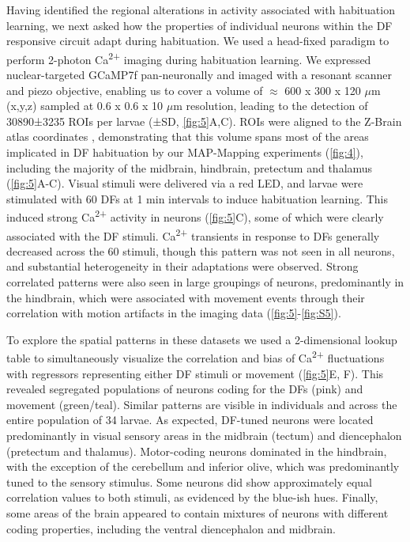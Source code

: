 \documentclass[9pt,lineno]{RandlettLab_elife}
\begin{document}
Having identified the regional alterations in activity associated with habituation learning, we next asked how the properties of individual neurons within the DF responsive circuit adapt during habituation. We used a head-fixed paradigm to perform 2-photon Ca\textsuperscript{2+} imaging during habituation learning. We expressed nuclear-targeted GCaMP7f pan-neuronally and imaged with a resonant scanner and piezo objective, enabling us to cover a volume of $\approx$ 600 x 300 x 120 $\mu$m (x,y,z) sampled at 0.6 x 0.6 x 10 $\mu$m resolution, leading to the detection of 30890±3235 ROIs per larvae (±SD, \autoref{fig:5}A,C). ROIs were aligned to the Z-Brain atlas coordinates \cite{Randlett2015-hy}, demonstrating that this volume spans most of the areas implicated in DF habituation by our MAP-Mapping experiments (\autoref{fig:4}), including the majority of the midbrain, hindbrain, pretectum and thalamus (\autoref{fig:5}A-C). Visual stimuli were delivered via a red LED, and larvae were stimulated with 60 DFs at 1 min intervals to induce habituation learning. This induced strong Ca\textsuperscript{2+} activity in neurons (\autoref{fig:5}C), some of which were clearly associated with the DF stimuli. Ca\textsuperscript{2+} transients in response to DFs generally decreased across the 60 stimuli, though this pattern was not seen in all neurons, and substantial heterogeneity in their adaptations were observed. Strong correlated patterns were also seen in large groupings of neurons, predominantly in the hindbrain, which were associated with movement events through their correlation with motion artifacts in the imaging data (\autoref{fig:5}-\autoref{fig:S5}). 

To explore the spatial patterns in these datasets we used a 2-dimensional lookup table to simultaneously visualize the correlation and bias of Ca\textsuperscript{2+} fluctuations with regressors representing either DF stimuli or movement (\autoref{fig:5}E, F). This revealed segregated populations of neurons coding for the DFs (pink) and movement (green/teal). Similar patterns are visible in individuals and across the entire population of 34 larvae. As expected, DF-tuned neurons were located predominantly in visual sensory areas in the midbrain (tectum) and diencephalon (pretectum and thalamus). Motor-coding neurons dominated in the hindbrain, with the exception of the cerebellum and inferior olive, which was predominantly tuned to the sensory stimulus. Some neurons did show approximately equal correlation values to both stimuli, as evidenced by the blue-ish hues. Finally, some areas of the brain appeared to contain mixtures of neurons with different coding properties, including the ventral diencephalon and midbrain. 
\end{document}
